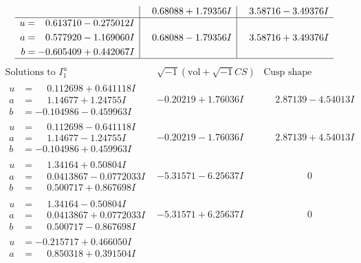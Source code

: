\documentclass[1p]{elsarticle_modified}
\theoremstyle{definition}
\newcommand{\I}{\sqrt{-1}}
\begin{document}
$$\begin{array}{c|c|c}
 & \phantom{-}0.68088 + 1.79356 I & \phantom{-}3.58716 - 3.49376 I \\ \hline\begin{aligned}
u &= \phantom{-}0.613710 - 0.275012 I \\
a &= \phantom{-}0.577920 - 1.169060 I \\
b &= -0.605409 + 0.442067 I\end{aligned}
 & \phantom{-}0.68088 - 1.79356 I & \phantom{-}3.58716 + 3.49376 I\\
 \hline 
 \end{array}$$\newpage$$\begin{array}{c|c|c}  
\text{Solutions to }I^u_{1}& \I (\text{vol} + \sqrt{-1}CS) & \text{Cusp shape}\\
 \hline 
\begin{aligned}
u &= \phantom{-}0.112698 + 0.641118 I \\
a &= \phantom{-}1.14677 + 1.24755 I \\
b &= -0.104986 - 0.459963 I\end{aligned}
 & -0.20219 + 1.76036 I & \phantom{-}2.87139 - 4.54013 I \\ \hline\begin{aligned}
u &= \phantom{-}0.112698 - 0.641118 I \\
a &= \phantom{-}1.14677 - 1.24755 I \\
b &= -0.104986 + 0.459963 I\end{aligned}
 & -0.20219 - 1.76036 I & \phantom{-}2.87139 + 4.54013 I \\ \hline\begin{aligned}
u &= \phantom{-}1.34164 + 0.50804 I \\
a &= \phantom{-}0.0413867 - 0.0772033 I \\
b &= \phantom{-}0.500717 + 0.867698 I\end{aligned}
 & -5.31571 - 6.25637 I & \phantom{-0.000000 } 0 \\ \hline\begin{aligned}
u &= \phantom{-}1.34164 - 0.50804 I \\
a &= \phantom{-}0.0413867 + 0.0772033 I \\
b &= \phantom{-}0.500717 - 0.867698 I\end{aligned}
 & -5.31571 + 6.25637 I & \phantom{-0.000000 } 0 \\ \hline\begin{aligned}
u &= -0.215717 + 0.466050 I \\
a &= \phantom{-}0.850318 + 0.391504 I \\

\end{aligned}
\end{array}$$
\end{document}
